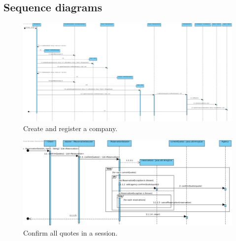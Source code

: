 \documentclass[10pt,a4paper]{article}
\begin{document}
\clearpage

\subsection{Sequence diagrams}

\begin{figure}[ht!]
\centering
\includegraphics[width=160mm]{registerCompany.png}
\caption{Create and register a company.} 
\end{figure}

\begin{figure}[ht!]
\centering
\includegraphics[width=160mm]{confirmQuotes.png}
\caption{Confirm all quotes in a session.} 
\end{figure}
\end{document}
